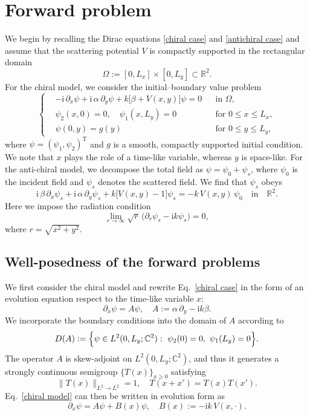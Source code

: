 \documentclass[12pt,reqno]{amsart}
\begin{document}
\section{Forward problem}
We begin by recalling the Dirac equations \eqref{chiral case} and \eqref{antichiral case} and assume that  the scattering potential $V$ is compactly supported in the rectangular domain
\[
    \Omega := [0,L_x]\times[0,L_y]\subset\mathbb{R}^2.
\]
For the chiral model, we consider the initial--boundary value problem
\begin{equation}\label{chiral model}
\left\{
\begin{aligned}
  &-\mathrm{i}\,\partial_x \psi + \mathrm{i}\,\alpha\,\partial_y \psi + k\bigl[\beta + V(x,y)\bigr]\psi = 0
  && \text{in } \Omega,\\[0.4em]
  &\psi_2(x,0)=0,\quad \psi_1(x,L_y)=0
  && \text{for } 0\le x\le L_x,\\[0.4em]
  &\psi(0,y)=g(y)
  && \text{for } 0\le y\le L_y,
\end{aligned}
\right.
\end{equation}
where $\psi=(\psi_1,\psi_2)^{\mathrm{T}}$ and $g$ is a smooth, compactly supported initial condition.
We note that $x$ plays the role of a time-like variable, whereas $y$ is space-like.
For the anti-chiral model, we decompose the total field as $\psi=\psi_0+\psi_s$, where $\psi_0$ is the incident field and $\psi_s$ denotes the scattered field. We find that $\psi_s$ obeys
\begin{equation}\label{s antichiral case}
    \mathrm{i}\,\beta\,\partial_x \psi_s + \mathrm{i}\,\alpha\,\partial_y \psi_s + k\bigl[V(x,y)-1\bigr]\psi_s
    = -k\,V(x,y)\,\psi_0 \quad  \text{in} \quad \mathbb R^2 .
    \end{equation}
Here we impose the radiation condition
\begin{equation}\label{radiation}
    \lim_{r\to\infty}\sqrt{r}\,\bigl(\partial_r\psi_s-\mathrm{i}k\psi_s\bigr)=0 ,
\end{equation}
where $r=\sqrt{x^2+y^2}$.

\subsection{Well-posedness of the forward problems}
We first consider the chiral model and rewrite Eq.~\eqref{chiral case} in the form of an evolution equation respect to the time-like variable $x$:
\[
\partial_x \psi = A\psi,
\quad
A := \alpha\,\partial_y - \mathrm{i}k\beta.
\]
We incorporate the boundary conditions into the domain of $A$ according to
\[
D(A)
:=\Bigl\{
\psi\in L^2(0,L_y;\mathbb{C}^2):
\ \psi_2(0)=0,\ \psi_1(L_y)=0
\Bigr\}.
\]
The operator $A$ is skew-adjoint on $L^2(0,L_y;\mathbb{C}^2)$, and thus it generates a strongly continuous semigroup $\{T(x)\}_{x\ge0}$ satisfying
\[
\|T(x)\|_{L^2\to L^2}=1,
\quad
T(x+x')=T(x)T(x').
\]
Eq.~\eqref{chiral model} can then be written in evolution form as
\[
\partial_x\psi = A\psi + B(x)\psi,
\quad
B(x):= -\mathrm{i}k\,V(x,\cdot).
\]
\end{document}
